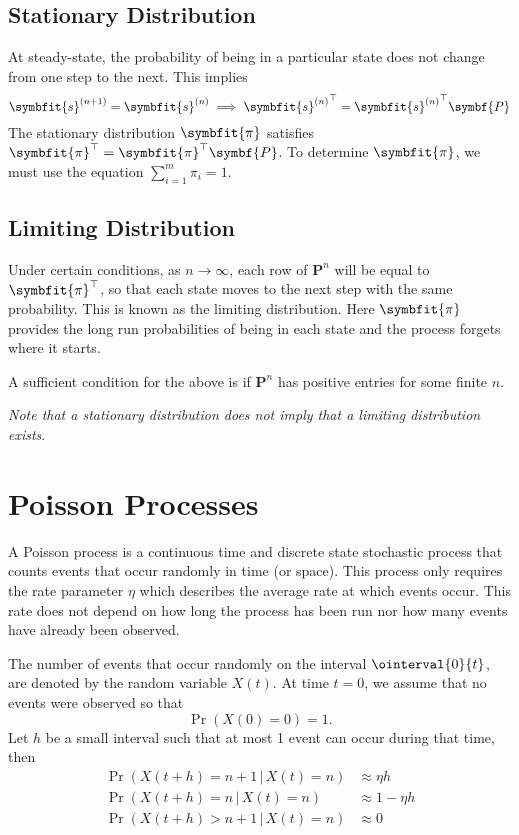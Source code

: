 \documentclass{article}
\begin{document}
\subsection{Stationary Distribution}
At steady-state, the probability of being in a particular state does not change from one step to the next.
This implies
\begin{equation*}
    \symbfit{s}^{(n+1)} = \symbfit{s}^{(n)} \implies {\symbfit{s}^{(n)}}^\top = {\symbfit{s}^{(n)}}^\top \symbf{P}
\end{equation*}
The stationary distribution \(\symbfit{\pi}\) satisfies \(\symbfit{\pi}^\top = \symbfit{\pi}^\top \symbf{P}\).
To determine \(\symbfit{\pi}\), we must use the equation \(\sum_{i = 1}^m \pi_i = 1\).
\subsection{Limiting Distribution}
Under certain conditions, as \(n \to \infty\), each row of \(\symbf{P}^n\) will be equal to \(\symbfit{\pi}^\top\),
so that each state moves to the next step with the same probability. This is known as the limiting distribution.
Here \(\symbfit{\pi}\) provides the long run probabilities of being in each state and the process forgets where it starts.

A sufficient condition for the above is if \(\symbf{P}^n\) has positive entries for some finite \(n\).

\textit{Note that a stationary distribution does not imply that a limiting distribution exists}.
\section{Poisson Processes}
A Poisson process is a continuous time and discrete state stochastic process that counts events
that occur randomly in time (or space).
This process only requires the rate parameter \(\eta\) which describes the average rate at which events occur.
This rate does not depend on how long the process has been run nor how many events have already been
observed.

The number of events that occur randomly on the interval \(\ointerval{0}{t}\), are denoted by the random variable \(X\left( t \right)\).
At time \(t = 0\), we assume that no events were observed so that
\begin{equation*}
    \Pr{\left( X\left( 0 \right) = 0 \right)} = 1.
\end{equation*}
Let \(h\) be a small interval such that at most 1 event can occur during that time, then
\begin{align*}
    \Pr{\left( X\left( t + h \right) = n + 1 \,\vert\, X\left( t \right) = n \right)} & \approx \eta h     \\
    \Pr{\left( X\left( t + h \right) = n \,\vert\, X\left( t \right) = n \right)}     & \approx 1 - \eta h \\
    \Pr{\left( X\left( t + h \right) > n + 1 \,\vert\, X\left( t \right) = n \right)} & \approx 0
\end{align*}
\end{document}
